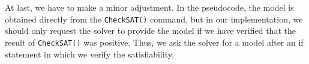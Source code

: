 At last, we have to make a minor adjustment. In the pseudocode, the model is obtained directly from the \texttt{CheckSAT()} command, but in our implementation, we should only request the solver to provide the model if we have verified that the result of \texttt{CheckSAT()} was positive. Thus, we ask the solver for a model after an if statement in which we verify the satisfiability.

